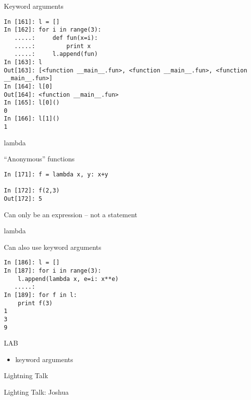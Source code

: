 \documentclass{beamer}
\begin{document}
\begin{frame}[fragile]{Keyword arguments}

\begin{verbatim}
In [161]: l = []
In [162]: for i in range(3):
   .....:     def fun(x=i):
   .....:         print x
   .....:     l.append(fun)
In [163]: l
Out[163]: [<function __main__.fun>, <function __main__.fun>, <function __main__.fun>]
In [164]: l[0]
Out[164]: <function __main__.fun>
In [165]: l[0]()
0
In [166]: l[1]()
1
\end{verbatim}

\end{frame} 

\begin{frame}[fragile]{lambda}

{\Large``Anonymous'' functions}

\vfill
\begin{verbatim}
In [171]: f = lambda x, y: x+y

In [172]: f(2,3)
Out[172]: 5
\end{verbatim}

\vfill
{\Large Can only be an expression -- not a statement}

\end{frame} 

\begin{frame}[fragile]{lambda}

{\Large Can also use keyword arguments}

\begin{verbatim}
In [186]: l = []
In [187]: for i in range(3):
    l.append(lambda x, e=i: x**e)
   .....:     
In [189]: for f in l:
    print f(3)
1
3
9
\end{verbatim}

\end{frame} 

\begin{frame}{LAB}

\begin{itemize}
  \item keyword arguments
\end{itemize}

\end{frame}


\begin{frame}{Lightning Talk}

{\center

\LARGE Lighting Talk:
\vfill
Joshua
\vfill

}
\end{frame}
\end{document}

